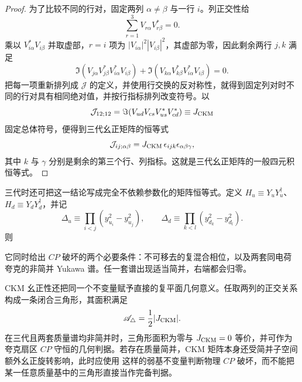 \begin{proof}
为了比较不同的行对，固定两列 $\alpha\neq\beta$ 与一行 $i$。列正交性给
\begin{equation*}
 \sum_{r=1}^{3}V_{r\alpha}V_{r\beta}^*=0.
\end{equation*}
乘以 $V_{i\alpha}^*V_{i\beta}$ 并取虚部，$r=i$ 项为
$|V_{i\alpha}|^2|V_{i\beta}|^2$，其虚部为零，因此剩余两行 $j,k$ 满足
\begin{equation*}
 \Im\!\left(
 V_{j\alpha}V_{j\beta}^*
 V_{i\alpha}^*V_{i\beta}
 \right)
 +
 \Im\!\left(
 V_{k\alpha}V_{k\beta}^*
 V_{i\alpha}^*V_{i\beta}
 \right)=0.
\end{equation*}
把每一项重新排列成 $\mathcal J$ 的定义，并使用行交换的反对称性，就得到固定列对时不同的行对具有相同绝对值，并按行指标排列改变符号。以
\begin{equation*}
 \mathcal J_{12;12}
 =\Im(V_{ud}V_{cs}V_{us}^*V_{cd}^*)
 \equiv J_{\rm CKM}
\end{equation*}
固定总体符号，便得到三代幺正矩阵的恒等式
\begin{equation*}
 \mathcal J_{ij;\alpha\beta}
 =J_{\rm CKM}\,\epsilon_{ijk}\epsilon_{\alpha\beta\gamma},
\end{equation*}
其中 $k$ 与 $\gamma$ 分别是剩余的第三个行、列指标。这就是三代幺正矩阵的一般四元积恒等式。
\end{proof}


\begin{theorem}[三代弱味的 $CP$ 判据]
三代时还可把这一结论写成完全不依赖参数化的矩阵恒等式。定义 $H_u\equiv Y_uY_u^\dagger$、$H_d\equiv Y_dY_d^\dagger$，并记
\begin{equation*}
 \Delta_u\equiv\prod_{i<j}(y_{u_i}^2-y_{u_j}^2),
 \qquad
 \Delta_d\equiv\prod_{k<l}(y_{d_k}^2-y_{d_l}^2).
\end{equation*}
则

它同时给出 $CP$ 破坏的两个必要条件：不可移去的复混合相位，以及两套同电荷夸克的非简并 Yukawa 谱。任一套谱出现适当简并，右端都会归零。

CKM 幺正性还把同一个不变量赋予直接的复平面几何意义。任取两列的正交关系构成一条闭合三角形，其面积满足
\begin{equation}
 {\mathscr A_\triangle=\frac12|J_{\rm CKM}|.}
 \label{eq:ckm-unitarity-triangle-area-dp41}
\end{equation}
在三代且两套质量谱均非简并时，三角形面积为零与 $J_{\rm CKM}=0$ 等价，并可作为夸克扇区 $CP$ 守恒的几何判据。若存在质量简并，CKM 矩阵本身还受简并子空间额外幺正旋转影响，此时应使用 这样的弱基不变量判断物理 $CP$ 破坏，而不能把某一任意质量基中的三角形直接当作完备判据。

\end{theorem}

